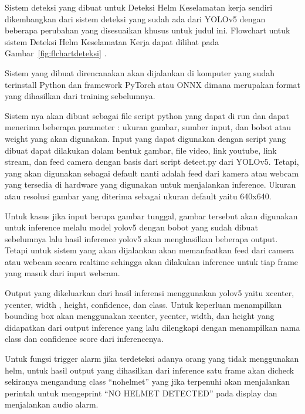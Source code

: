 Sistem deteksi yang dibuat untuk Deteksi Helm Keselamatan kerja sendiri dikembangkan dari sistem deteksi yang sudah ada dari YOLOv5 dengan beberapa perubahan yang disesuaikan khusus untuk judul ini. Flowchart untuk sistem Deteksi Helm Keselamatan Kerja dapat dilihat pada Gambar~\ref{fig:flchartdeteksi} .

Sistem yang dibuat direncanakan akan dijalankan di komputer yang sudah terinstall Python dan framework PyTorch atau ONNX dimana merupakan format yang dihasilkan dari training sebelumnya.

Sistem nya akan dibuat sebagai file script python yang dapat di run dan dapat menerima beberapa parameter : ukuran gambar, sumber input, dan bobot atau weight yang akan digunakan. 
Input yang dapat digunakan dengan script yang dibuat dapat dilakukan dalam bentuk gambar, file video, link youtube, link stream, dan feed camera dengan basis dari script detect.py dari YOLOv5. Tetapi, yang akan digunakan sebagai default nanti adalah feed dari kamera atau webcam yang tersedia di hardware yang digunakan untuk menjalankan inference. Ukuran atau resolusi gambar yang diterima sebagai ukuran default yaitu 640x640. 

Untuk kasus jika input berupa gambar tunggal, gambar tersebut akan digunakan untuk inference melalu model yolov5 dengan bobot yang sudah dibuat sebelumnya lalu hasil inference yolov5 akan menghasilkan beberapa output. Tetapi untuk sistem yang akan dijalankan akan memanfaatkan feed dari camera atau webcam secara realtime sehingga akan dilakukan inference untuk tiap frame yang masuk dari input webcam.

Output yang dikeluarkan dari hasil inferensi menggunakan yolov5 yaitu xcenter, ycenter, width , height, confidence, dan class. Untuk keperluan menampilkan bounding box akan menggunakan xcenter, ycenter, width, dan height yang didapatkan dari output inference yang lalu dilengkapi dengan menampilkan nama class dan confidence score dari inferencenya. 

Untuk fungsi trigger alarm jika terdeteksi adanya orang yang tidak menggunakan helm, untuk hasil output yang dihasilkan dari inference satu frame akan dicheck sekiranya mengandung class “no\textunderscore helmet” yang jika terpenuhi akan  menjalankan perintah untuk mengeprint “NO HELMET DETECTED” pada display dan menjalankan audio alarm. 

